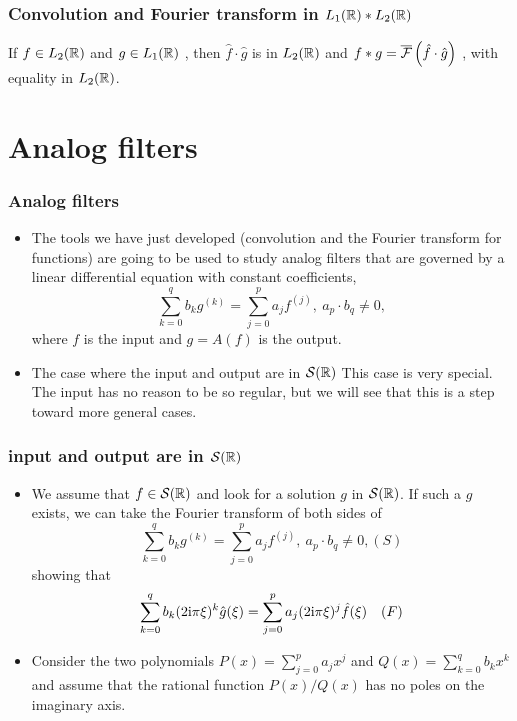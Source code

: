 \begin{frame}
\frametitle{Convolution and Fourier transform in $L_1(\mathbb{R}) * L_2(\mathbb{R})$}
\begin{theorem}
If $ f\in L_2(\mathbb{R})$ and $g\in L_1(\mathbb{R})$ , then $\hat{f}\cdot\hat{g}$  is in $L_2(\mathbb{R})$  and $f*g=\overline{\mathcal{F}}\left( \hat{f}\cdot\hat{g} \right)$ , with  equality in $L_2(\mathbb{R})$.
\end{theorem}
\end{frame}

\section{Analog filters}
\begin{frame}
\frametitle{Analog filters}
\begin{itemize}
\item The tools we have just developed (convolution and the Fourier transform for functions) are going to be used to study analog filters that are governed by a linear differential equation with constant coefficients,
$$
\sum_{k=0}^{q}b_{k}g^{(k)}=\sum_{j=0}^{p}a_{j}f^{(j)},\ a_{p}\cdot b_{q}\neq 0,
$$
where $f$ is the input and $g=A(f)$ is the output. 
\item  The case where the input and output are in $\mathcal{S}(\mathbb{R})$ This case is very special. The input has no reason to be so regular, but we will see that this is a step toward more general cases.
\end{itemize}
\end{frame}

\begin{frame}
\frametitle{input and output are in $\mathcal{S}(\mathbb{R})$}
\begin{itemize}
\item We assume that $f\in \mathcal{S}(\mathbb{R})$ and look for a solution $g$ in $\mathcal{S}(\mathbb{R})$. If such a $g$ exists, we can take the Fourier transform of both sides of 
$$
\sum_{k=0}^{q}b_{k}g^{(k)}=\sum_{j=0}^{p}a_{j}f^{(j)},\ a_{p}\cdot b_{q}\neq 0, (S)
$$
showing that    
$$
\sum_{k=0}^{q}b_{k}(2\mathrm{i}\pi\xi)^{k}\hat{g}(\xi)=\sum_{j=0}^{p}a_{j}(2\mathrm{i}\pi\xi)^{j}\hat{f}(\xi) \quad (F)
$$
\item Consider the two polynomials $P(x)= \sum_{j=0}^{p}a_{j}x^{j}$ and $Q(x)=\sum_{k=0}^{q}b_{k}x^{k}$
and assume that the rational function $P(x)/Q(x)$ has no poles on the imaginary axis. 
\end{itemize}
\end{frame}

